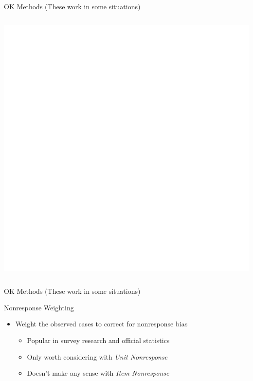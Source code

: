 \documentclass{beamer}\usepackage[]{graphicx}\usepackage[]{color}
\makeatletter
\def\maxwidth{ %
  \ifdim\Gin@nat@width>\linewidth
    \linewidth
  \else
    \Gin@nat@width
  \fi
}
\newenvironment{knitrout}{}{} %
\makeatother
\begin{document}
\begin{frame}{OK Methods (These work in some situations)}
\begin{columns}
\begin{column}{0.5\textwidth}
\begin{knitrout}
{\centering \includegraphics[width=\maxwidth]{figure/intro-unnamed-chunk-25-1} 

}


\end{knitrout}

\end{column}
\end{columns}

\end{frame}

\watermarkon %

\begin{frame}{OK Methods (These work in some situations)}
  
  Nonresponse Weighting
  \vc
  \begin{itemize}
  \item Weight the observed cases to correct for nonresponse bias
    \vc
    \begin{itemize}
    \item Popular in survey research and official statistics
      \vc
    \item Only worth considering with \emph{Unit Nonresponse}
      \vc
    \item Doesn't make any sense with \emph{Item Nonresponse}
    \end{itemize}
  \end{itemize}
  
\end{frame}
\end{document}
